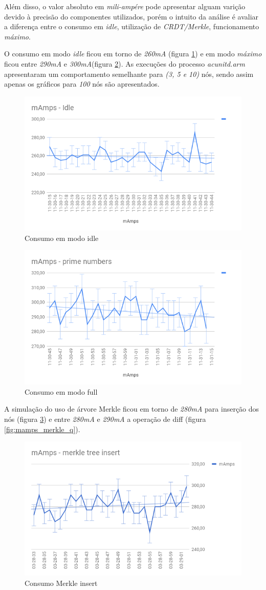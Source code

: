 \documentclass[12pt]{article}
\begin{document}
Além disso, o valor absoluto em {\it mili-ampére} pode apresentar alguam varição devido à precisão do componentes utilizados, porém o intuito da análise é avaliar a diferença entre o consumo em {\it idle}, utilização de {\it CRDT/Merkle}, funcionamento {\it máximo}.

O consumo em modo {\it idle} ficou em torno de {\it 260mA} (figura \ref{fig:mamps_idle}) e em modo {\it máximo} ficou entre {\it 290mA} e {\it 300mA}(figura \ref{fig:mamps_full}). As execuções do processo {\it acunitd.arm} apresentaram um comportamento semelhante para {\it (3, 5 e 10)} nós, sendo assim apenas os gráficos para {\it 100} nós são apresentados.

\begin{figure}[ht]
\centering
\includegraphics[width=.5\textwidth]{mAmps-idle.png}
\caption{Consumo em modo idle}
\label{fig:mamps_idle}
\end{figure}

\begin{figure}[ht]
\centering
\includegraphics[width=.5\textwidth]{mAmps-full.png}
\caption{Consumo em modo full}
\label{fig:mamps_full}
\end{figure}

A simulação do uso de árvore Merkle ficou em torno de {\it 280mA} para inserção dos nós (figura \ref{fig:mamps_merkle_i}) e entre {\it 280mA} e {\it 290mA} a operação de diff (figura \ref{fig:mamps_merkle_q}).

\begin{figure}[ht]
\centering
\includegraphics[width=.5\textwidth]{mAmps-merkle-insert.png}
\caption{Consumo Merkle insert}
\label{fig:mamps_merkle_i}
\end{figure}
\end{document}
